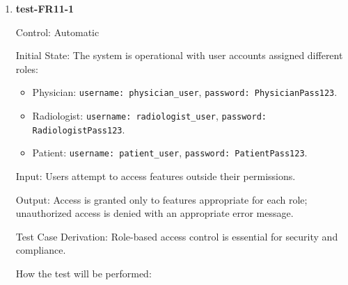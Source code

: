\documentclass[12pt, titlepage]{article}
\begin{document}
\begin{enumerate}

\item \textbf{test-FR11-1} \label{test-FR11-1}

Control: Automatic

Initial State: The system is operational with user accounts assigned different roles:
\begin{itemize}
  \item Physician: \texttt{username: physician\_user}, \texttt{password: PhysicianPass123}.
  \item Radiologist: \texttt{username: radiologist\_user}, \texttt{password: RadiologistPass123}.
  \item Patient: \texttt{username: patient\_user}, \texttt{password: PatientPass123}.
\end{itemize}

Input: Users attempt to access features outside their permissions.

Output: Access is granted only to features appropriate for each role; unauthorized access is denied with an appropriate error message.

Test Case Derivation: Role-based access control is essential for security and compliance.

How the test will be performed:


\end{enumerate}
\end{document}
